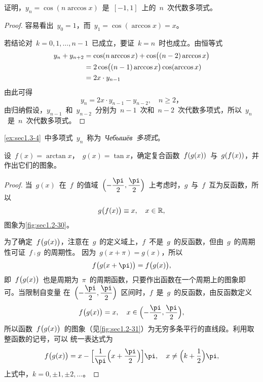 \begin{example}\label{ex:sec1.3-4}
证明，$y_n=\cos(n\arccos x)$~是~$[-1,1]$~上的~$n$~次代数多项式。
\end{example}
\begin{proof}
容易看出~$y_0=1$，而~$y_1=\cos(\arccos x)=x$。

若结论对~$k=0,1,\dotsc,n-1$~已成立，要证~$k=n$~时也成立。由恒等式
\begin{align*}
y_n+y_{n+2}
&=\cos(n\arccos x)+\cos\bigl\lparen(n-2)\arccos x\bigr\rparen\\
&=2\cos\bigl\lparen(n-1)\arccos x\bigr\rparen\cos(\arccos x)\\
&=2x\cdot y_{n-1}
\end{align*}
由此可得
\[
  y_n=2x\cdot y_{n-1}-y_{n-2},\quad n\geq2，
\]
由归纳假设，$y_{n-1}$~和~$y_{n-2}$~分别为~$n-1$~次和~$n-2$~次代数多项式，所以~$y_n$~是~$n$~次代数多项式。
\end{proof}

\ref{ex:sec1.3-4}~中多项式~$y_n$~称为~\emph{Чебышёв~多项式}。

\begin{example}
设~$f(x)=\arctan x$，~$g(x)=\tan x$，确定复合函数~$f\lparen g(x)\rparen$~与~$g\lparen f(x)\rparen$，并作出它们的图象。
\end{example}
\begin{proof}
当~$g(x)$~在~$f$~的值域~$\Paren[\Big]{-\dfrac\pi2,\dfrac\pi2}$~上考虑时，$g$~与~$f$~互为反函数，所以
\[
  g\bigl\lparen f(x)\bigr\rparen\equiv x,\quad x\in\mathbb{R},
\]
图象为\ref{fig:sec1.2-30}。

\begin{figure}
\begin{floatrow}[2]
\figurebox{\caption{}\label{fig:sec1.2-30}}
          {\somefigure}
\figurebox{\caption{}\label{fig:sec1.2-31}}
          {\somefigure}
\end{floatrow}
\end{figure}

为了确定~$f\bigl\lparen g(x)\bigr\rparen$，注意在~$g$~的定义域上，$f$~不是~$g$~的反函数，但由~$g$~的周期性可证~$f\comp g$~的周期性。%
因为~$g(x+\pi)=g(x)$，所以
\[
  f\Parenb{g(x+\pi)}=f\Parenb{g(x)},
\]
即~$f\bigl\lparen g(x)\bigr\rparen$~也是周期为~$\pi$~的周期函数，只要作出函数在一个周期上的图象即可。当限制自变量
在~$\Paren[\Big]{-\dfrac\pi2,\dfrac\pi2}$~区间时，$f$~是~$g$~的反函数，由反函数定义
\[
  f\Parenb{g(x)}=x,\quad x\in\Paren[\Big]{-\dfrac\pi2,\dfrac\pi2},
\]
所以函数~$f\bigl\lparen g(x)\bigr\rparen$~的图象（见\ref{fig:sec1.2-31}）为无穷多条平行的直线段。利用取整函数的记号，可以
统一表达式为
\[
f\Parenb{g(x)}=x-\Floor[\Big]{\frac1\pi\Paren[\Big]{x+\frac\pi2}}\pi,\quad x\neq\Paren[\Big]{k+\frac12}\pi,
\]
上式中，$k=0,\pm1,\pm2,\dotsc$。
\end{proof}


